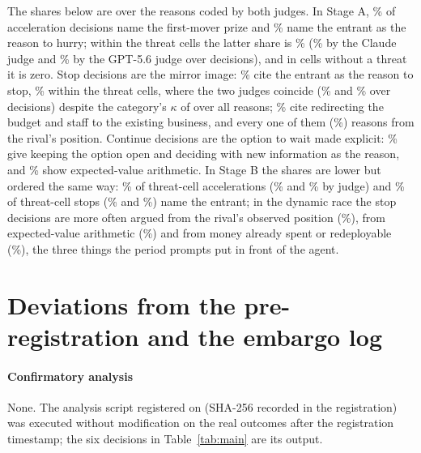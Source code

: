 \documentclass[preprint,12pt,authoryear]{elsarticle}
\begin{document}
The shares below are over the \CodesN{} reasons coded by both judges. In Stage A, \ShareAAFirstMoverPrizePct\% of acceleration decisions name the first-mover prize and \ShareAAThreatHurryPct\% name the entrant as the reason to hurry; within the threat cells the latter share is \ShareAAccelThreatHurryPct\% (\JudgeAAccelThreatHurryFablePct\% by the Claude judge and \JudgeAAccelThreatHurryGptPct\% by the GPT-5.6 judge over \JudgeAAccelThreatHurryN{} decisions), and in cells without a threat it is zero. Stop decisions are the mirror image: \ShareAQThreatQuitPct\% cite the entrant as the reason to stop, \ShareAQuitThreatQuitPct\% within the threat cells, where the two judges coincide (\JudgeAStopThreatQuitFablePct\% and \JudgeAStopThreatQuitGptPct\% over \JudgeAStopThreatQuitN{} decisions) despite the category's $\kappa$ of \KappaMThree{} over all reasons; \ShareAQSunkOrSalvagePct\% cite redirecting the budget and staff to the existing business, and every one of them (\ShareAQRivalPositionPct\%) reasons from the rival's position. Continue decisions are the option to wait made explicit: \ShareACWaitAndSeePct\% give keeping the option open and deciding with new information as the reason, and \ShareACExpectedValuePct\% show expected-value arithmetic. In Stage B the shares are lower but ordered the same way: \ShareBAccelThreatHurryPct\% of threat-cell accelerations (\JudgeBAccelThreatHurryFablePct\% and \JudgeBAccelThreatHurryGptPct\% by judge) and \ShareBQuitThreatQuitPct\% of threat-cell stops (\JudgeBStopThreatQuitFablePct\% and \JudgeBStopThreatQuitGptPct\%) name the entrant; in the dynamic race the stop decisions are more often argued from the rival's observed position (\ShareBQRivalPositionPct\%), from expected-value arithmetic (\ShareBQExpectedValuePct\%) and from money already spent or redeployable (\ShareBQSunkOrSalvagePct\%), the three things the period prompts put in front of the agent.

\section{Deviations from the pre-registration and the embargo log}
\label{app:deviations}

\paragraph{Confirmatory analysis} None. The analysis script registered on \OSFRegisteredDate{} (SHA-256 recorded in the registration) was executed without modification on the real outcomes after the registration timestamp; the six decisions in Table~\ref{tab:main} are its output.
\end{document}
